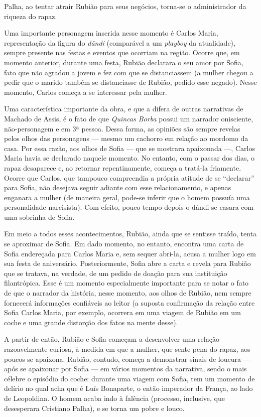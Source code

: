 Palha, ao tentar atrair Rubião para seus negócios, torna-se o administrador da riqueza do rapaz.

Uma importante personagem inserida nesse momento é Carlos Maria, representação da figura do \textit{dândi} (comparável a um \textit{playboy} da atualidade), sempre presente nas festas e eventos que ocorriam na região. Ocorre que, em momento anterior, durante uma festa, Rubião declarara o seu amor por Sofia, fato que não agradou a jovem e fez com que se distanciassem (a mulher chegou a pedir que o marido também se distanciasse de Rubião, pedido esse negado). Nesse momento, Carlos começa a se interessar pela mulher.

Uma característica importante da obra, e que a difera de outras narrativas de Machado de Assis, é o fato de que \textit{Quincas Borba} possui um narrador onisciente, não-personagem e em 3ª pessoa. Dessa forma, as opiniões são sempre revelas pelos olhos das personagens — mesmo um cachorro em relação ao mordomo da casa. Por essa razão, aos olhos de Sofia — que se mostrara apaixonada —, Carlos Maria havia se declarado naquele momento. No entanto, com o passar dos dias, o rapaz desaparece e, ao retornar repentinamente, começa a tratá-la friamente. Ocorre que Carlos, que tampouco compreendia a própria atitude de se ``declarar'' para Sofia, não desejava seguir adiante com esse relacionamento, e apenas enganara a mulher (de maneira geral, pode-se inferir que o homem possuía uma personalidade narcisista). Com efeito, pouco tempo depois o dândi se casara com uma sobrinha de Sofia.

Em meio a todos esses acontecimentos, Rubião, ainda que se sentisse traído, tenta se aproximar de Sofia. Em dado momento, no entanto, encontra uma carta de Sofia endereçada para Carlos Maria e, sem sequer abri-la, acusa a mulher logo em sua festa de aniversário. Posteriormente, Sofia abre a carta e revela para Rubião que se tratava, na verdade, de um pedido de doação para sua instituição filantrópica. Esse é um momento especialmente importante para se notar o fato de que o narrador da história, nesse momento, aos olhos de Rubião, nem sempre fornecerá informações confiáveis ao leitor (a suposta confirmação da relação entre Sofia Carlos Maria, por exemplo, ocorrera em uma viagem de Rubião em um coche e uma grande distorção dos fatos na mente desse).

A partir de então, Rubião e Sofia começam a desenvolver uma relação razoavelmente curiosa, à medida em que a mulher, que sente pena do rapaz, aos poucos se apaixona. Rubião, contudo, começa a demonstrar sinais de loucura — após se apaixonar por Sofia — em vários momentos da narrativa, sendo o mais célebre o episódio do coche: durante uma viagem com Sofia, tem um momento de delírio no qual acha que é Luís Bonaparte, o então imperador da França, ao lado de Leopoldina. O homem acaba indo à falência (processo, inclusive, que desesperara Cristiano Palha), e se torna um pobre e louco.

